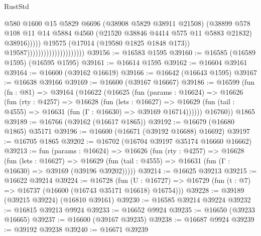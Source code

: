 \begin{lexlean}{RustStd}
\begin{coremodule}
{\begin{coremodule}
{{{{{{{{{{{{{{{{{{{{{{{{{{{{{{{{{{{{{{{{{{{{{{{{{{{{{{{                                                      @580
                                                      @1600
                                                      @15
                                                      @5829
                                                      @6696
                                                      (@38908 @5829 @38911 @21508)
                                                      (@38899
                                                        @578
                                                        @108
                                                        @11
                                                        @14
                                                        @5884
                                                        @4560
                                                        (@21520 @38846 @4414 @575 @11 @5883 @21832)
                                                        @38916)))))
                                              @19575
                                              (@17014 (@19580 @1825 @1848 @173))
                                              @19587)))))))))))))))))))))
@39156 := @16583 @1595
@39160 := @16585 (@16589 @1595) (@16595 @1595)
@39161 := @16614 @1595
@39162 := @16604 @39161
@39164 := @16600 (@39162 @16619)
@39166 := @16642 (@16643 @1595)
@39167 := @16638 @39166
@39169 := @16600 (@39167 @16667)
@39186 := @16599
    (fun (fn : @81) =>
    @39164
      (@16622
        (@16625
          (fun (params : @16624) =>
          @16626
            (fun (rty : @4257) =>
            @16628
              (fun (lets : @16627) =>
              @16629 (fun (tail : @4555) => @16631 (fun (Γ : @16630) => @39169 @16714))))))
        @16760))
    @1865
@39189 := @16766 (@39162 (@16617 @1865))
@39192 := @16679 (@16680 @1865) @35171
@39196 := @16600 (@16671 (@39192 @16688) @16692)
@39197 := @16705 @1865
@39202 := @16702 (@16704 @39197 @35174 @16660 @16662)
@39213 := fun (params : @16624) =>
  @16626
    (fun (rty : @4257) =>
    @16628
      (fun (lets : @16627) =>
      @16629 (fun (tail : @4555) => @16631 (fun (Γ : @16630) => @39169 (@39196 @39202)))))
@39214 := @16625 @39213
@39215 := @16622 @39214
@39224 := @16728
    (fun (U : @16727) => @16729 (fun (t : @7) => @16737 (@16600 (@16743 @35171 @16618) @16754)))
@39228 := @39189 (@39215 @39224) (@16810 @39161)
@39230 := @16585 @39214 @39224
@39232 := @16815 @39213 @9924
@39233 := @16652 @9924
@39235 := @16650 (@39233 @16665)
@39237 := @16600 (@39167 @39235)
@39238 := @16687 @9924
@39239 := @39192 @39238
@39240 := @16671 @39239
}}}}}}}}}}}}}}}}}}}}}}}}}}}}}}}}}}}}}}}}}}}}}}}}}}}}}}}
\end{coremodule}}
\end{coremodule}
\end{lexlean}
